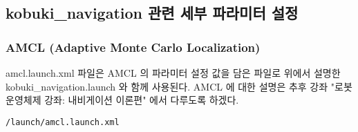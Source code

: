 \subsection{kobuki\_navigation 관련 세부 파라미터 설정}

\subsubsection{AMCL (Adaptive Monte Carlo Localization)}
amcl.launch.xml 파일은 AMCL 의 파라미터 설정 값을 담은 파일로 위에서 설명한 kobuki\_navigation.launch 와 함께 사용된다. AMCL 에 대한 설명은 추후 강좌 "로봇 운영체제 강좌: 내비게이션 이론편" 에서 다루도록 하겠다.

\vspace{\baselineskip}
\begin{lstlisting}[language=ROS]
/launch/amcl.launch.xml
\end{lstlisting}

